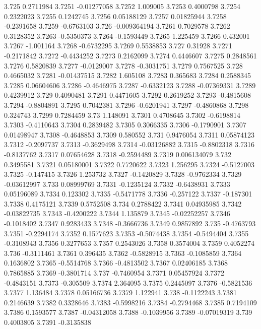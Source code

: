 3.725  0.2711984
3.7251  -0.01277058
3.7252  1.009005
3.7253  0.4000798
3.7254  0.2322023
3.7255  0.1242745
3.7256  0.05188129
3.7257  0.01825944
3.7258  -0.2391658
3.7259  -0.6763103
3.726  -0.009364194
3.7261  0.7029578
3.7262  0.3128352
3.7263  -0.5350373
3.7264  -0.1593449
3.7265  1.225459
3.7266  0.432001
3.7267  -1.001164
3.7268  -0.6732295
3.7269  0.5538853
3.727  0.31928
3.7271  -0.2171842
3.7272  -0.4434252
3.7273  0.2162099
3.7274  0.4446607
3.7275  0.2848561
3.7276  0.5820839
3.7277  -0.0129007
3.7278  -0.3031751
3.7279  0.7567525
3.728  0.4665032
3.7281  -0.01437515
3.7282  1.605108
3.7283  0.365683
3.7284  0.2588345
3.7285  0.06604606
3.7286  -0.4646975
3.7287  -0.6332123
3.7288  -0.07369331
3.7289  0.4239912
3.729  0.4090481
3.7291  0.4471605
3.7292  0.2619252
3.7293  -0.4815608
3.7294  -0.8804891
3.7295  0.7042381
3.7296  -0.6201941
3.7297  -0.4860868
3.7298  0.324743
3.7299  0.7284459
3.73  1.148091
3.7301  0.4708645
3.7302  -0.6198814
3.7303  -0.4110643
3.7304  0.2839482
3.7305  0.3066335
3.7306  -0.1790901
3.7307  0.01498947
3.7308  -0.4648853
3.7309  0.580552
3.731  0.9476054
3.7311  0.05874123
3.7312  -0.2097737
3.7313  -0.3629498
3.7314  -0.03126882
3.7315  -0.8802318
3.7316  -0.8137762
3.7317  0.07654628
3.7318  -0.2594489
3.7319  0.006134079
3.732  0.3495581
3.7321  0.05180001
3.7322  0.7720622
3.7323  1.256295
3.7324  -0.5127003
3.7325  -0.147415
3.7326  1.253732
3.7327  -0.1420829
3.7328  -0.9762334
3.7329  -0.03612997
3.733  0.08999769
3.7331  -0.1235124
3.7332  -0.6438931
3.7333  0.05196089
3.7334  0.123302
3.7335  -0.5471778
3.7336  -0.257122
3.7337  -0.187301
3.7338  0.4175121
3.7339  0.5752508
3.734  0.2788422
3.7341  0.04935985
3.7342  -0.03822735
3.7343  -0.4200222
3.7344  1.135879
3.7345  -0.02252257
3.7346  -0.1018402
3.7347  0.9283433
3.7348  -0.3666736
3.7349  0.9857892
3.735  -0.4763793
3.7351  -0.2294174
3.7352  0.1577623
3.7353  -0.5074438
3.7354  -0.5494404
3.7355  -0.3108943
3.7356  0.3277653
3.7357  0.2543026
3.7358  0.3574004
3.7359  0.4052274
3.736  -0.3111461
3.7361  0.396435
3.7362  -0.5828915
3.7363  -0.1085859
3.7364  0.1636802
3.7365  -0.5514768
3.7366  -0.4813502
3.7367  0.02406185
3.7368  0.7865885
3.7369  -0.3801714
3.737  -0.7460954
3.7371  0.05457924
3.7372  -0.4843151
3.7373  -0.305509
3.7374  2.364095
3.7375  0.2445097
3.7376  -0.5821536
3.7377  1.136484
3.7378  0.05166736
3.7379  1.122941
3.738  -0.1122243
3.7381  0.2146639
3.7382  0.3328646
3.7383  -0.5998216
3.7384  -0.2794468
3.7385  0.7194109
3.7386  0.1593577
3.7387  -0.04312058
3.7388  -0.1039956
3.7389  -0.07019319
3.739  0.4003805
3.7391  -0.3135838
